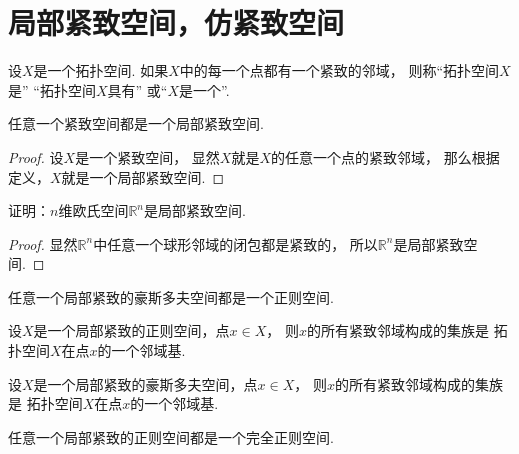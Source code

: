 \section{局部紧致空间，仿紧致空间}
\begin{definition}
设\(X\)是一个拓扑空间.
如果\(X\)中的每一个点都有一个紧致的邻域，
则称“拓扑空间\(X\)是”
“拓扑空间\(X\)具有”
或“\(X\)是一个”.
\end{definition}

\begin{proposition}
任意一个紧致空间都是一个局部紧致空间.
\begin{proof}
设\(X\)是一个紧致空间，
显然\(X\)就是\(X\)的任意一个点的紧致邻域，
那么根据定义，\(X\)就是一个局部紧致空间.
\end{proof}
\end{proposition}

\begin{example}
证明：\(n\)维欧氏空间\(\mathbb{R}^n\)是局部紧致空间.
\begin{proof}
显然\(\mathbb{R}^n\)中任意一个球形邻域的闭包都是紧致的，
所以\(\mathbb{R}^n\)是局部紧致空间.
\end{proof}
\end{example}

\begin{theorem}
任意一个局部紧致的豪斯多夫空间都是一个正则空间.
\end{theorem}

\begin{theorem}
设\(X\)是一个局部紧致的正则空间，点\(x \in X\)，
则\(x\)的所有紧致邻域构成的集族是
拓扑空间\(X\)在点\(x\)的一个邻域基.
\end{theorem}

\begin{corollary}
设\(X\)是一个局部紧致的豪斯多夫空间，点\(x \in X\)，
则\(x\)的所有紧致邻域构成的集族是
拓扑空间\(X\)在点\(x\)的一个邻域基.
\end{corollary}

\begin{theorem}
任意一个局部紧致的正则空间都是一个完全正则空间.
\end{theorem}


